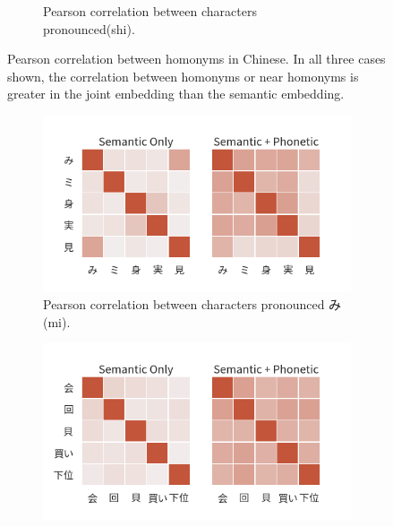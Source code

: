 \begin{figure}[h]
\begin{subfigure}[b]{0.46\textwidth}
        \caption{Pearson correlation between characters pronounced (shi).}
        \label{fig:corr_zh3}
    \end{subfigure}
    \caption[Pearson correlation between homonyms in Chinese]{Pearson correlation between homonyms in Chinese. In all three cases shown, the correlation between homonyms or near homonyms is greater in the joint embedding than the semantic embedding.}
    \label{fig:corr_zh}
\end{figure}

\vspace{-2em}
\begin{CJK}{UTF8}{ipxm}
\begin{figure}[h!]
    \centering
    \begin{subfigure}[b]{0.46\textwidth}
        \centering
        \includegraphics[width=\textwidth]{../images/corr_ja1.png}
        \caption{Pearson correlation between characters pronounced み (mi).}
        \label{fig:corr_ja1}
    \end{subfigure}
    \hspace{2em}
    \begin{subfigure}[b]{0.46\textwidth}
        \centering
        \includegraphics[width=\textwidth]{../images/corr_ja2.png}

\end{subfigure}
\end{figure}
\end{CJK}
